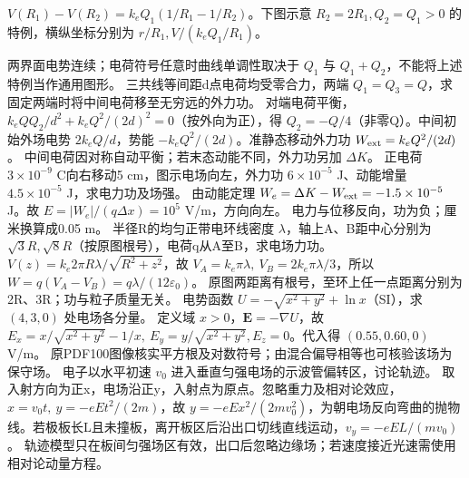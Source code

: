 $V(R_1)-V(R_2)=k_eQ_1(1/R_1-1/R_2)$。下图示意 $R_2=2R_1,Q_2=Q_1>0$ 的特例，横纵坐标分别为 $r/R_1,V/(k_eQ_1/R_1)$。
\begin{center}
\end{center}
\crosscheck 两界面电势连续；电荷符号任意时曲线单调性取决于 $Q_1$ 与 $Q_1+Q_2$，不能将上述特例当作通用图形。
\problemtext 三共线等间距d点电荷均受零合力，两端 $Q_1=Q_3=Q$，求固定两端时将中间电荷移至无穷远的外力功。
\workings 对端电荷平衡，$k_eQQ_2/d^2+k_eQ^2/(2d)^2=0$（按外向为正），得 $Q_2=-Q/4$（非零Q）。中间初始外场电势 $2k_eQ/d$，势能 $-k_eQ^2/(2d)$。准静态移动外力功 $W_{\rm ext}=k_eQ^2/(2d)$。
\crosscheck 中间电荷因对称自动平衡；若末态动能不同，外力功另加 $\Delta K$。
\problemtext 正电荷 $3\times10^{-9}$ C向右移动5 cm，图示电场向左，外力功 $6\times10^{-5}$ J、动能增量 $4.5\times10^{-5}$ J，求电力功及场强。
\workings 由动能定理 $W_e=\Delta K-W_{\rm ext}=-1.5\times10^{-5}$ J。故 $E=|W_e|/(q\Delta x)=10^5$ V/m，方向向左。
\crosscheck 电力与位移反向，功为负；厘米换算成0.05 m。
\problemtext 半径R的均匀正带电环线密度 $\lambda$，轴上A、B距中心分别为 $\sqrt3R,\sqrt8R$（按原图根号），电荷q从A至B，求电场力功。
\workings $V(z)=k_e2\pi R\lambda/\sqrt{R^2+z^2}$，故 $V_A=k_e\pi\lambda,\ V_B=2k_e\pi\lambda/3$，所以 $W=q(V_A-V_B)=q\lambda/(12\varepsilon_0)$。
\crosscheck 原图两距离有根号，至环上任一点距离分别为2R、3R；功与粒子质量无关。
\problemtext 电势函数 $U=-\sqrt{x^2+y^2}+\ln x$（SI），求 $(4,3,0)$ 处电场各分量。
\workings 定义域 $x>0$，$\bm E=-\nabla U$，故 $E_x=x/\sqrt{x^2+y^2}-1/x,\ E_y=y/\sqrt{x^2+y^2}, E_z=0$。代入得 $(0.55,0.60,0)$ V/m。
\crosscheck 原PDF100图像核实平方根及对数符号；由混合偏导相等也可核验该场为保守场。
\problemtext 电子以水平初速 $v_0$ 进入垂直匀强电场的示波管偏转区，讨论轨迹。
\workings 取入射方向为正x，电场沿正y，入射点为原点。忽略重力及相对论效应，$x=v_0t,\ y=-eEt^2/(2m)$，故 $y=-eEx^2/(2mv_0^2)$，为朝电场反向弯曲的抛物线。若极板长L且未撞板，离开板区后沿出口切线直线运动，$v_y=-eEL/(mv_0)$。
\crosscheck 轨迹模型只在板间匀强场区有效，出口后忽略边缘场；若速度接近光速需使用相对论动量方程。

